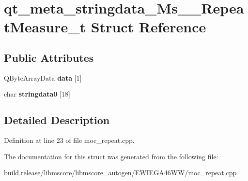 \hypertarget{structqt__meta__stringdata___ms_____repeat_measure__t}{}\section{qt\+\_\+meta\+\_\+stringdata\+\_\+\+Ms\+\_\+\+\_\+\+Repeat\+Measure\+\_\+t Struct Reference}
\label{structqt__meta__stringdata___ms_____repeat_measure__t}
\subsection*{Public Attributes}
\begin{DoxyCompactItemize}
\item 
\mbox{\label{structqt__meta__stringdata___ms_____repeat_measure__t_a791d3f0721de3f2f5fee11f5327def12}} 
Q\+Byte\+Array\+Data {\bfseries data} \mbox{[}1\mbox{]}
\item 
\mbox{\label{structqt__meta__stringdata___ms_____repeat_measure__t_a1396a5e67a581e835e3fc3f5523c2bd0}} 
char {\bfseries stringdata0} \mbox{[}18\mbox{]}
\end{DoxyCompactItemize}


\subsection{Detailed Description}


Definition at line 23 of file moc\+\_\+repeat.\+cpp.



The documentation for this struct was generated from the following file\+:\begin{DoxyCompactItemize}
\item 
build.\+release/libmscore/libmscore\+\_\+autogen/\+E\+W\+I\+E\+G\+A46\+W\+W/moc\+\_\+repeat.\+cpp\end{DoxyCompactItemize}
